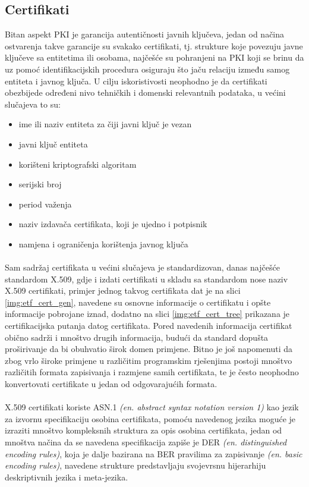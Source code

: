 \subsection{Certifikati}
Bitan aspekt PKI je garancija autentičnosti javnih ključeva, jedan od načina ostvarenja takve garancije su svakako certifikati, tj. strukture koje povezuju javne ključeve sa entitetima ili osobama, najčešće su pohranjeni na PKI koji se brinu da uz pomoć identifikacijskih procedura osiguraju što jaču relaciju između samog entiteta i javnog ključa. U cilju iskoristivosti neophodno je da certifikati obezbijede određeni nivo tehničkih i domenski relevantnih podataka, u većini slučajeva to su:

\begin{itemize}
    \item ime ili naziv entiteta za čiji javni ključ je vezan
    \item javni ključ entiteta
    \item korišteni kriptografski algoritam
    \item serijski broj
    \item period važenja
    \item naziv izdavača certifikata, koji je ujedno i potpisnik
    \item namjena i ograničenja korištenja javnog ključa
\end{itemize}

\paragraph*{}
Sam sadržaj certifikata u većini slučajeva je standardizovan, danas najčešće standardom X.509, gdje i izdati certifikati u skladu sa standardom nose naziv X.509 certifikati\cite{x509}, primjer jednog takvog certifikata dat je na slici \ref{img:etf_cert_gen}, navedene su osnovne informacije o certifikatu i opšte informacije pobrojane iznad, dodatno na slici \ref{img:etf_cert_tree} prikazana je certifikacijska putanja datog certifikata. Pored navedenih informacija certifikat obično sadrži i mnoštvo drugih informacija, budući da standard dopušta proširivanje da bi obuhvatio širok domen primjene. Bitno je još napomenuti da zbog vrlo široke primjene u različitim programskim rješenjima postoji mnoštvo različitih formata zapisivanja i razmjene samih certifikata, te je često neophodno konvertovati certifikate u jedan od odgovarajućih formata.

\paragraph*{}
X.509 certifikati koriste ASN.1 \textit{(en. abstract syntax notation version 1)} kao jezik za izvornu specifikaciju osobina certifikata, pomoću navedenog jezika moguće je izraziti mnoštvo kompleksnih struktura za opis osobina certifikata, jedan od mnoštva načina da se navedena specifikacija zapiše je DER \textit{(en. distinguished encoding rules)}, koja je dalje bazirana na BER pravilima za zapisivanje \textit{(en. basic encoding rules)}, navedene strukture predstavljaju svojevrsnu hijerarhiju deskriptivnih jezika i meta-jezika.

